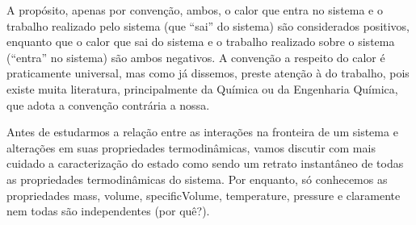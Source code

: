     A propósito, apenas por convenção, ambos, o calor que entra no sistema e o
    trabalho realizado pelo sistema (que \enquote{sai} do sistema) são
    considerados positivos, enquanto que o calor que sai do sistema e o
    trabalho realizado sobre o sistema (\enquote{entra} no sistema) são ambos
    negativos. A convenção a respeito do calor é praticamente universal, mas
    como já dissemos, preste atenção à do trabalho, pois existe muita
    literatura, principalmente da Química ou da Engenharia Química, que adota a
    convenção contrária a nossa.

    Antes de estudarmos a relação entre as interações na fronteira de um
    sistema e alterações em suas propriedades termodinâmicas, vamos discutir
    com mais cuidado a caracterização do estado como sendo um retrato
    instantâneo de todas as propriedades termodinâmicas do sistema. Por
    enquanto, só conhecemos as propriedades \gls{mass}, \gls{volume},
    \gls{specificVolume}, \gls{temperature}, \gls{pressure} e claramente nem
    todas são independentes (por quê?).

